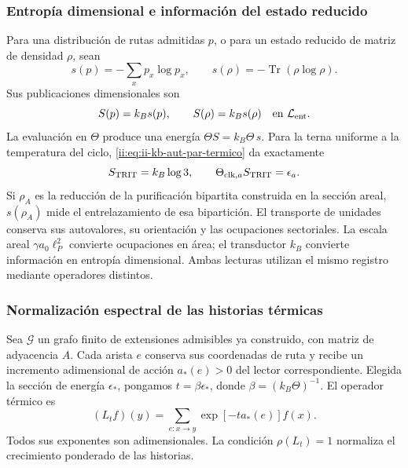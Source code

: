\subsubsection{Entropía dimensional e información del estado reducido}

Para una distribución de rutas admitidas \(p\), o para un estado
reducido de matriz de densidad \(\rho\), sean
\[
 s(p)=-\sum_xp_x\log p_x,\qquad
 s(\rho)=-\operatorname{Tr}(\rho\log\rho).
\]
Sus publicaciones dimensionales son
\begin{equation}
 S(p)=k_Bs(p),\qquad S(\rho)=k_Bs(\rho)
 \quad\text{en }\mathcal L_{\rm ent}.
 \label{ii:eq:ii-kb-aut-entropia}
\end{equation}
La evaluación en \(\Theta\) produce una energía
\(\Theta S=k_B\Theta\,s\). Para la terna uniforme a la temperatura
del ciclo, \eqref{ii:eq:ii-kb-aut-par-termico} da exactamente
\[
 S_{\rm TRIT}=k_B\log3,\qquad
 \Theta_{{\rm clk},a}S_{\rm TRIT}=\epsilon_a.
\]
Si \(\rho_A\) es la reducción de la purificación bipartita
construida en la sección areal, \(s(\rho_A)\) mide el entrelazamiento
de esa bipartición. El transporte de unidades conserva sus
autovalores, su orientación y las ocupaciones sectoriales. La escala
areal \(\gamma a_0\ell_P^2\) convierte ocupaciones en área; el
transductor \(k_B\) convierte información en entropía dimensional.
Ambas lecturas utilizan el mismo registro mediante operadores distintos.

\subsubsection{Normalización espectral de las historias térmicas}

Sea \(\mathcal G\) un grafo finito de extensiones admisibles ya
construido, con matriz de adyacencia \(A\). Cada arista \(e\) conserva
sus coordenadas de ruta y recibe un incremento adimensional de acción
\(a_*(e)>0\) del lector correspondiente. Elegida la sección de energía
\(\epsilon_*\), pongamos \(t=\beta\epsilon_*\), donde
\(\beta=(k_B\Theta)^{-1}\). El operador térmico es
\begin{equation}
 (L_tf)(y)=\sum_{e:x\to y}\exp[-t a_*(e)]f(x).
 \label{ii:eq:ii-kb-aut-operador}
\end{equation}
Todos sus exponentes son adimensionales. La condición
\(\rho(L_t)=1\) normaliza el crecimiento ponderado de las historias.

